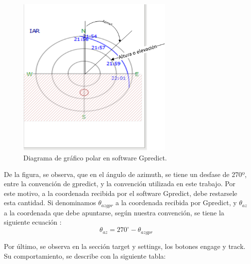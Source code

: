 \begin{figure}[ht]
	\centering
	\includegraphics[height=8cm]{polar_plot}
	\caption{Diagrama de gráfico polar en software Gpredict.} 
	\label{fig:polar_plot_expl}
\end{figure}

De la figura, se observa, que en el ángulo de azimuth, se tiene un desfase de 270º, entre la convención de gpredict, y la convención utilizada en este trabajo. Por este motivo, a la coordenada recibida por el software Gpredict, debe restarsele esta cantidad. Si denominamos $\theta_{azgpr}$ a la coordenada recibida por Gpredict, y $\theta_{az}$ a la coordenada que debe apuntarse, según nuestra convención, se tiene la siguiente ecuación :
\begin{equation}
	\theta_{az} =270^\circ - \theta_{azgpr}
\end{equation}

Por último, se observa en la sección target y settings, los botones engage y track. Su comportamiento, se describe con la siguiente tabla: 

